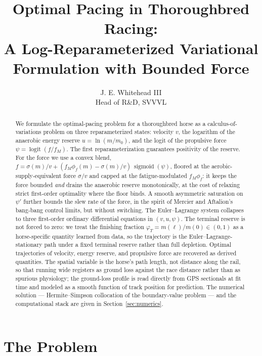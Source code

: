 \documentclass[11pt]{article}
\title{Optimal Pacing in Thoroughbred Racing:\\
A Log-Reparameterized Variational Formulation with Bounded Force}
\author{J. E. Whitehead III \\ Head of R\&D, SVVVL}
\date{}
\DeclareMathOperator{\sigmoid}{sigmoid}
\DeclareMathOperator{\logit}{logit}
\begin{document}
\maketitle
\thispagestyle{empty}

\begin{abstract}
We formulate the optimal-pacing problem for a thoroughbred horse as a calculus-of-variations problem on three reparameterized states: velocity $v$, the logarithm of the anaerobic energy reserve $u = \ln(m/m_0)$, and the logit of the propulsive force $\psi = \logit(f/f_M)$. The first reparameterization guarantees positivity of the reserve. For the force we use a convex blend, $f = \sigma(m)/v + (f_M \phi_f(m) - \sigma(m)/v)\,\sigmoid(\psi)$, floored at the aerobic-supply-equivalent force $\sigma/v$ and capped at the fatigue-modulated $f_M \phi_f$: it keeps the force bounded \emph{and} drains the anaerobic reserve monotonically, at the cost of relaxing strict first-order optimality where the floor binds. A smooth asymmetric saturation on $\psi'$ further bounds the slew rate of the force, in the spirit of Mercier and Aftalion's bang-bang control limits, but without switching. The Euler--Lagrange system collapses to three first-order ordinary differential equations in $(v, u, \psi)$. The terminal reserve is not forced to zero: we treat the finishing fraction $\varphi_T = m(\ell)/m(0) \in (0, 1)$ as a horse-specific quantity learned from data, so the trajectory is the Euler--Lagrange-stationary path under a fixed terminal reserve rather than full depletion. Optimal trajectories of velocity, energy reserve, and propulsive force are recovered as derived quantities. The spatial variable is the horse's path length, not distance along the rail, so that running wide registers as ground loss against the race distance rather than as spurious physiology; the ground-loss profile is read directly from GPS sectionals at fit time and modeled as a smooth function of track position for prediction. The numerical solution --- Hermite--Simpson collocation of the boundary-value problem --- and the computational stack are given in Section~\ref{sec:numerics}.
\end{abstract}

\newpage
\tableofcontents
\newpage

\section{The Problem}\label{sec:problem}
\end{document}
